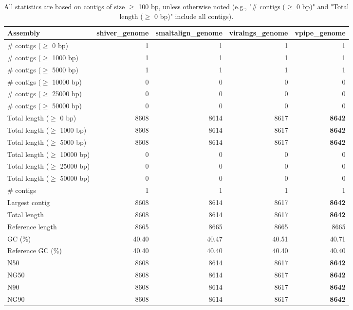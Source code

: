 \documentclass[12pt,a4paper]{article}
\begin{document}
\begin{table}[ht]
\begin{center}
\caption{All statistics are based on contigs of size $\geq$ 100 bp, unless otherwise noted (e.g., "\# contigs ($\geq$ 0 bp)" and "Total length ($\geq$ 0 bp)" include all contigs).}
\begin{tabular}{|l*{4}{|r}|}
\hline
Assembly & shiver\_genome & smaltalign\_genome & viralngs\_genome & vpipe\_genome \\ \hline
\# contigs ($\geq$ 0 bp) & 1 & 1 & 1 & 1 \\ \hline
\# contigs ($\geq$ 1000 bp) & 1 & 1 & 1 & 1 \\ \hline
\# contigs ($\geq$ 5000 bp) & 1 & 1 & 1 & 1 \\ \hline
\# contigs ($\geq$ 10000 bp) & 0 & 0 & 0 & 0 \\ \hline
\# contigs ($\geq$ 25000 bp) & 0 & 0 & 0 & 0 \\ \hline
\# contigs ($\geq$ 50000 bp) & 0 & 0 & 0 & 0 \\ \hline
Total length ($\geq$ 0 bp) & 8608 & 8614 & 8617 & {\bf 8642} \\ \hline
Total length ($\geq$ 1000 bp) & 8608 & 8614 & 8617 & {\bf 8642} \\ \hline
Total length ($\geq$ 5000 bp) & 8608 & 8614 & 8617 & {\bf 8642} \\ \hline
Total length ($\geq$ 10000 bp) & 0 & 0 & 0 & 0 \\ \hline
Total length ($\geq$ 25000 bp) & 0 & 0 & 0 & 0 \\ \hline
Total length ($\geq$ 50000 bp) & 0 & 0 & 0 & 0 \\ \hline
\# contigs & 1 & 1 & 1 & 1 \\ \hline
Largest contig & 8608 & 8614 & 8617 & {\bf 8642} \\ \hline
Total length & 8608 & 8614 & 8617 & {\bf 8642} \\ \hline
Reference length & 8665 & 8665 & 8665 & 8665 \\ \hline
GC (\%) & 40.40 & 40.47 & 40.51 & 40.71 \\ \hline
Reference GC (\%) & 40.40 & 40.40 & 40.40 & 40.40 \\ \hline
N50 & 8608 & 8614 & 8617 & {\bf 8642} \\ \hline
NG50 & 8608 & 8614 & 8617 & {\bf 8642} \\ \hline
N90 & 8608 & 8614 & 8617 & {\bf 8642} \\ \hline
NG90 & 8608 & 8614 & 8617 & {\bf 8642} \\ \hline

\end{tabular}
\end{center}
\end{table}
\end{document}
